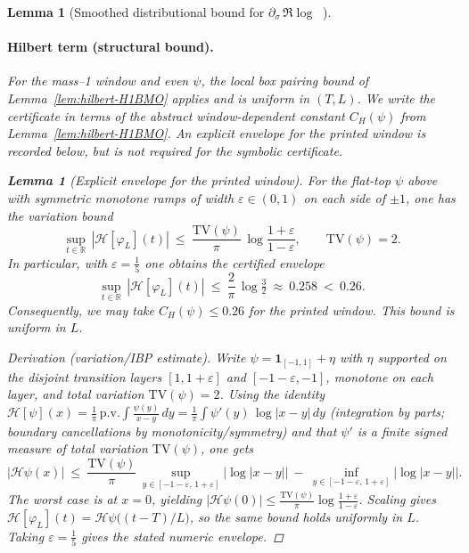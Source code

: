 \documentclass[11pt]{article}
\newtheorem{lemma}[theorem]{Lemma}
\theoremstyle{definition}
\theoremstyle{remark}
\newcommand{\R}{\mathbb{R}}
\DeclareMathOperator{\dettwo}{det_2}
\begin{document}
\begin{lemma}[Smoothed distributional bound for $\partial_\sigma\,\Re\log\dettwo$]
\paragraph{Hilbert term (structural bound).}
For the mass--1 window and even \(\psi\), the local box pairing bound of Lemma~\ref{lem:hilbert-H1BMO} applies and is uniform in \((T,L)\). We write the certificate in terms of the abstract window-dependent constant \(C_H(\psi)\) from Lemma~\ref{lem:hilbert-H1BMO}. An explicit envelope for the printed window is recorded below, but is not required for the symbolic certificate.
\begin{lemma}[Explicit envelope for the printed window]\label{lem:CH-explicit}
For the flat-top \(\psi\) above with symmetric monotone ramps of width \(\varepsilon\in(0,1)\) on each side of \(\pm1\), one has the variation bound
\[
  \sup_{t\in\R}\,|\mathcal H[\varphi_L](t)|\ \le\ \frac{\mathrm{TV}(\psi)}{\pi}\,\log\frac{1+\varepsilon}{1-\varepsilon},\qquad \mathrm{TV}(\psi)=2.
\]
In particular, with \(\varepsilon=\tfrac15\) one obtains the certified envelope
\[
  \sup_{t\in\R}\,|\mathcal H[\varphi_L](t)|\ \le\ \frac{2}{\pi}\,\log\tfrac{3}{2}\ \approx\ 0.258\ <\ 0.26.
\]
Consequently, we may take \(C_H(\psi)\le 0.26\) for the printed window. This bound is uniform in \(L\).
\end{lemma}
\begin{proof}[Derivation (variation/IBP estimate)]
Write \(\psi=\mathbf 1_{[-1,1]}+\eta\) with \(\eta\) supported on the disjoint transition layers \([1,1+\varepsilon]\) and \([-1-\varepsilon,-1]\), monotone on each layer, and total variation \(\mathrm{TV}(\psi)=2\). Using the identity \(\mathcal H[\psi](x)=\tfrac{1}{\pi}\,\mathrm{p.v.}\int \tfrac{\psi(y)}{x-y}\,dy=\tfrac{1}{\pi}\int \psi'(y)\,\log|x-y|\,dy\) (integration by parts; boundary cancellations by monotonicity/symmetry) and that \(\psi'\) is a finite signed measure of total variation \(\mathrm{TV}(\psi)\), one gets
\[
  |\mathcal H\psi(x)|\ \le\ \frac{\mathrm{TV}(\psi)}{\pi}\,\sup_{y\in[-1-\varepsilon,\,1+\varepsilon]}\big|\log|x-y|\big|\ -\ \inf_{y\in[-1-\varepsilon,\,1+\varepsilon]}\big|\log|x-y|\big|.
\]
The worst case is at \(x=0\), yielding \(|\mathcal H\psi(0)|\le \tfrac{\mathrm{TV}(\psi)}{\pi}\log\tfrac{1+\varepsilon}{1-\varepsilon}\). Scaling gives \(\mathcal H[\varphi_L](t)=\mathcal H\psi\big((t-T)/L\big)\), so the same bound holds uniformly in \(L\). Taking \(\varepsilon=\tfrac15\) gives the stated numeric envelope.
\end{proof}

\end{lemma}
\end{document}
